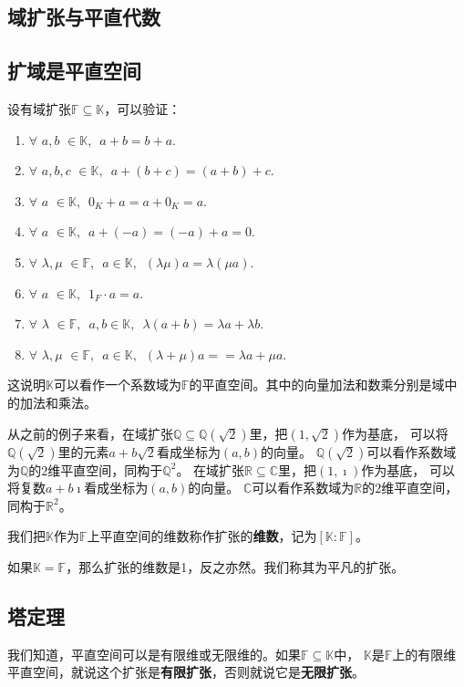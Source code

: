 \documentclass[12pt,UTF8,fontset=none]{ctexbook}
\begin{document}
\begin{appendix}
\section{域扩张与平直代数}
\subsection{扩域是平直空间}
设有域扩张$\mathbb{F} \subseteq \mathbb{K}$，可以验证：
\begin{enumerate}
    \item $\forall \,\, a, b \,\, \in \mathbb{K}, \,\,\, a + b = b + a.$
    \item $\forall \,\, a, b, c \,\, \in \mathbb{K}, \,\,\, a + (b + c) = (a + b) + c.$
    \item $\forall \,\, a \,\, \in \mathbb{K}, \,\,\, 0_K + a = a + 0_K = a.$
    \item $\forall \,\, a \,\, \in \mathbb{K}, \,\,\, a + (-a) = (-a) + a = 0.$
    \item $\forall \,\, \lambda, \mu \,\, \in \mathbb{F}, \,\,\, a \in \mathbb{K}, \,\,\, (\lambda \mu) a = \lambda(\mu a). $
    \item $\forall \,\, a \,\, \in \mathbb{K}, \,\,\, 1_F \cdot a = a.$
    \item $\forall \,\, \lambda \,\, \in \mathbb{F}, \,\,\, a, b \in \mathbb{K}, \,\,\, \lambda(a + b) = \lambda a + \lambda b.$
    \item $\forall \,\, \lambda, \mu \,\, \in \mathbb{F}, \,\,\, a \in \mathbb{K}, \,\,\, (\lambda + \mu) a =  = \lambda a + \mu a.$
\end{enumerate}
这说明$\mathbb{K}$可以看作一个系数域为$\mathbb{F}$的平直空间。其中的向量加法和数乘分别是域中的加法和乘法。

从之前的例子来看，在域扩张$\mathbb{Q} \subseteq \mathbb{Q}(\sqrt{2})$里，把$(1, \sqrt{2})$作为基底，
可以将$\mathbb{Q}(\sqrt{2})$里的元素$a + b\sqrt{2}$看成坐标为$(a, b)$的向量。
$\mathbb{Q}(\sqrt{2})$可以看作系数域为$\mathbb{Q}$的$2$维平直空间，同构于$\mathbb{Q}^2$。
在域扩张$\mathbb{R} \subseteq \mathbb{C}$里，把$(1, \imath )$作为基底，
可以将复数$a + b\imath $看成坐标为$(a, b)$的向量。
$\mathbb{C}$可以看作系数域为$\mathbb{R}$的$2$维平直空间，同构于$\mathbb{R}^2$。

我们把$\mathbb{K}$作为$\mathbb{F}$上平直空间的维数称作扩张的\textbf{维数}，记为$[\mathbb{K} : \mathbb{F}]$。

如果$\mathbb{K} = \mathbb{F}$，那么扩张的维数是1，反之亦然。我们称其为平凡的扩张。

\subsection{塔定理}
我们知道，平直空间可以是有限维或无限维的。如果$\mathbb{F} \subseteq \mathbb{K}$中，
$\mathbb{K}$是$\mathbb{F}$上的有限维平直空间，就说这个扩张是\textbf{有限扩张}，否则就说它是\textbf{无限扩张}。


\end{appendix}
\end{document}
